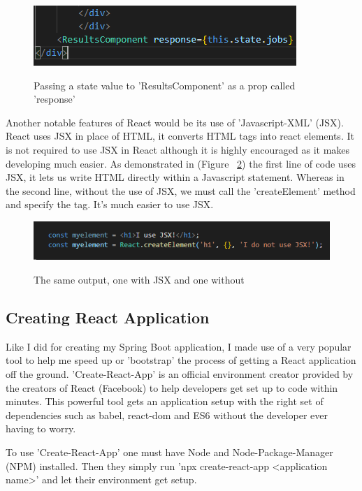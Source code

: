 \begin{figure}[h]
    \centering
    \includegraphics[scale=0.8]{Images/react1.png} 
    \label{react1_label}
    \caption{Passing a state value to 'ResultsComponent' as a prop called 'response'}
\end{figure}

Another notable features of React would be its use of 'Javascript-XML' (JSX). React uses JSX in place of HTML, it converts HTML tags into react elements. It is not required to use JSX in React although it is highly encouraged as it makes developing much easier. As demonstrated in (Figure ~\ref{react2_label}) the first line of code uses JSX, it lets us write HTML directly within a Javascript statement. Whereas in the second line, without the use of JSX, we must call the 'createElement' method and specify the tag. It's much easier to use JSX.

\begin{figure}[ht]
    \centering
    \includegraphics[scale=0.7]{Images/react2.png} 
    \label{react2_label}
    \caption{The same output, one with JSX and one without}
\end{figure}

\subsection{Creating React Application}
Like I did for creating my Spring Boot application, I made use of a very popular tool to help me speed up or 'bootstrap' the process of getting a React application off the ground. 'Create-React-App' is an official environment creator provided by the creators of React (Facebook) to help developers get set up to code within minutes. This powerful tool gets an application setup with the right set of dependencies such as babel, react-dom and ES6 without the developer ever having to worry.

To use 'Create-React-App' one must have Node and Node-Package-Manager (NPM) installed. Then they simply run 'npx create-react-app <application name>' and let their environment get setup.

